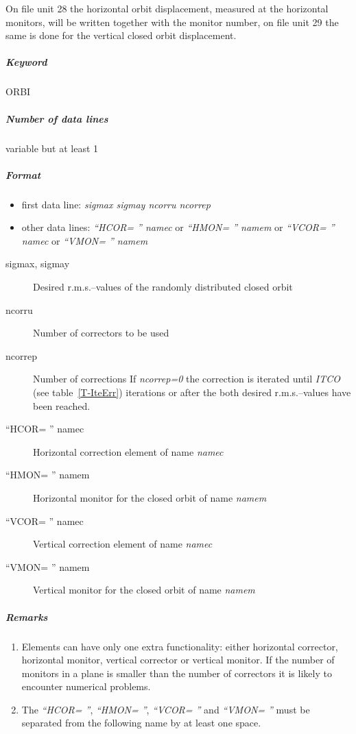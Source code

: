 \documentclass[a4paper,11pt]{report}
\begin{document}
On file unit 28 the horizontal orbit displacement, measured at the
horizontal monitors, will be written together with the monitor number,
on file unit 29 the same is done for the vertical closed orbit
displacement. 

\subparagraph{Keyword} ORBI \subparagraph{Number of data lines}
variable but at least 1

\subparagraph{Format}
\begin{itemize}
\item first data line: {\em sigmax sigmay ncorru ncorrep}
\item other data lines: {\em ``HCOR= '' namec} \/or {\em ``HMON= ''
    namem} \newline or {\em ``VCOR= '' namec} \/or {\em ``VMON= ''
    namem}
\end{itemize}

\begin{description}
\item [sigmax, sigmay] Desired r.m.s.--values of the randomly distributed
  closed orbit
\item [ncorru] Number of correctors to be used
\item [ncorrep] Number of corrections \newline If {\em ncorrep=0}
  \/the correction is iterated until {\em ITCO} \/(see
  table~\ref{T-IteErr}) iterations or after the both desired
  r.m.s.--values have been reached.
\item [``HCOR= '' namec] Horizontal correction element of name {\em
    namec}
\item [``HMON= '' namem] Horizontal monitor for the closed orbit of
  name {\em namem}
\item [``VCOR= '' namec] Vertical correction element of name {\em
    namec}
\item [``VMON= '' namem] Vertical monitor for the closed orbit of name
  {\em namem}
\end{description}

\subparagraph{Remarks}
\begin{enumerate}
\item Elements can have only one extra functionality: either
  horizontal corrector, horizontal monitor, vertical corrector or
  vertical monitor. If the number of monitors in a plane is smaller
  than the number of correctors it is likely to encounter numerical
  problems.
\item The {\em ``HCOR= ''}\/, {\em ``HMON= ''}\/, {\em ``VCOR= ''}
  \/and {\em ``VMON= ''} \/must be separated from the following name
  by at least one space.
\end{enumerate}
\end{document}
